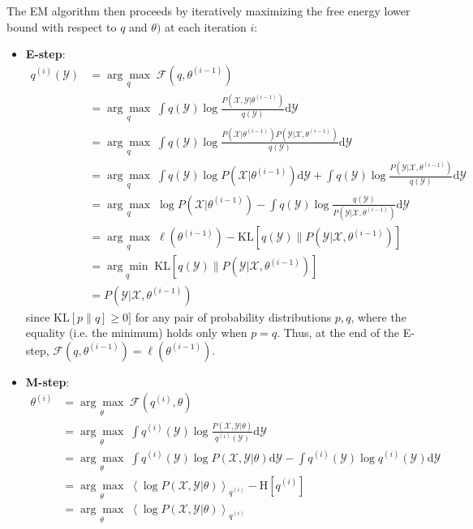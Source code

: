 \documentclass[a4paper]{article}
\begin{document}
The EM algorithm then proceeds by iteratively maximizing the free energy lower bound with respect to $q$ and $\theta)$ at each iteration $i$:
\begin{itemize}
\item \textbf{E-step}:
\begin{align*}
q^{(i)}(\mathcal{Y}) &= \underset{q}{\arg\max} \;\mathcal{F}(q,\theta^{(i-1)}) \\
&= \underset{q}{\arg\max} \; \int q(\mathcal{Y}) \log\frac{P(\mathcal{X},\mathcal{Y}|\theta^{(i-1)})}{q(\mathcal{Y})} \textrm{d}\mathcal{Y} \\ 
&= \underset{q}{\arg\max} \; \int q(\mathcal{Y}) \log\frac{P(\mathcal{X}|\theta^{(i-1)})P(\mathcal{Y}|\mathcal{X},\theta^{(i-1)})}{q(\mathcal{Y})} \textrm{d}\mathcal{Y} \\ 
&= \underset{q}{\arg\max} \; \int q(\mathcal{Y})\log P(\mathcal{X}|\theta^{(i-1)})\textrm{d}\mathcal{Y} + \int q(\mathcal{Y}) \log\frac{P(\mathcal{Y}|\mathcal{X},\theta^{(i-1)})}{q(\mathcal{Y})} \textrm{d}\mathcal{Y} \\ 
&= \underset{q}{\arg\max} \; \log P(\mathcal{X}|\theta^{(i-1)}) - \int q(\mathcal{Y}) \log\frac{q(\mathcal{Y})}{P(\mathcal{Y}|\mathcal{X},\theta^{(i-1)})} \textrm{d}\mathcal{Y} \\ 
&= \underset{q}{\arg\max} \; \ell(\theta^{(i-1)}) - \textrm{KL}\left[q(\mathcal{Y})\|P(\mathcal{Y}|\mathcal{X},\theta^{(i-1)}) \right] \\
&= \underset{q}{\arg\min} \; \textrm{KL}\left[q(\mathcal{Y})\|P(\mathcal{Y}|\mathcal{X},\theta^{(i-1)}) \right] \\ 
&= P(\mathcal{Y}|\mathcal{X},\theta^{(i-1)})
\end{align*}
since $\textrm{KL}[p\|q] \geq 0]$ for any pair of probability distributions $p,q$, where the equality (i.e. the minimum) holds only when $p=q$. Thus, at the end of the E-step, $\mathcal{F}(q,\theta^{(i-1)}) = \ell(\theta^{(i-1)})$.
\item \textbf{M-step}:
\begin{align*}
\theta^{(i)} &= \underset{\theta}{\arg\max} \;\mathcal{F}(q^{(i)},\theta) \\
&= \underset{\theta}{\arg\max} \; \int q^{(i)}(\mathcal{Y}) \log\frac{P(\mathcal{X},\mathcal{Y}|\theta)}{q^{(i)}(\mathcal{Y})} \textrm{d}\mathcal{Y} \\ 
&= \underset{\theta}{\arg\max} \; \int q^{(i)}(\mathcal{Y}) \log P(\mathcal{X},\mathcal{Y}|\theta) \textrm{d}\mathcal{Y} - \int q^{(i)}(\mathcal{Y}) \log q^{(i)}(\mathcal{Y}) \textrm{d}\mathcal{Y} \\ 
&= \underset{\theta}{\arg\max} \; \left\langle\log P(\mathcal{X},\mathcal{Y}|\theta)\right\rangle_{q^{(i)}} - \textrm{H}[q^{(i)}] \\
&= \underset{\theta}{\arg\max} \; \left\langle\log P(\mathcal{X},\mathcal{Y}|\theta)\right\rangle_{q^{(i)}}
\end{align*}
\end{itemize}
\end{document}
